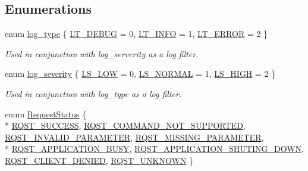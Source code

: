 \subsection*{Enumerations}
\begin{DoxyCompactItemize}
\item 
enum \hyperlink{namespacekisscpp_a18db16d1f4c281bec16e637c56b0cc88}{log\-\_\-type} \{ \hyperlink{namespacekisscpp_a18db16d1f4c281bec16e637c56b0cc88a5534dcd03ff720ecbe64b0c91ea3b228}{L\-T\-\_\-\-D\-E\-B\-U\-G} = 0, 
\hyperlink{namespacekisscpp_a18db16d1f4c281bec16e637c56b0cc88ad1c780d761d1eec16905dd8e306764aa}{L\-T\-\_\-\-I\-N\-F\-O} = 1, 
\hyperlink{namespacekisscpp_a18db16d1f4c281bec16e637c56b0cc88ad444adf89c01661a3f2cacd8baea3d90}{L\-T\-\_\-\-E\-R\-R\-O\-R} = 2
 \}
\begin{DoxyCompactList}\small\item\em Used in conjunction with log\-\_\-serverity as a log filter. \end{DoxyCompactList}\item 
enum \hyperlink{namespacekisscpp_a2479a56cdedf21357ca5c68adc699d00}{log\-\_\-severity} \{ \hyperlink{namespacekisscpp_a2479a56cdedf21357ca5c68adc699d00af0d1f4c43feb2c79cbd2c44cba171b9f}{L\-S\-\_\-\-L\-O\-W} = 0, 
\hyperlink{namespacekisscpp_a2479a56cdedf21357ca5c68adc699d00aac284c5fe534f527e04da9327a0e484e}{L\-S\-\_\-\-N\-O\-R\-M\-A\-L} = 1, 
\hyperlink{namespacekisscpp_a2479a56cdedf21357ca5c68adc699d00a98a2f9d2011b440e4a890b9c0dbb7bc2}{L\-S\-\_\-\-H\-I\-G\-H} = 2
 \}
\begin{DoxyCompactList}\small\item\em Used in conjunction with log\-\_\-type as a log filter. \end{DoxyCompactList}\item 
enum \hyperlink{namespacekisscpp_af5792fb0f68695c1a1e7a4c720d9262e}{Request\-Status} \{ \\*
\hyperlink{namespacekisscpp_af5792fb0f68695c1a1e7a4c720d9262ea48f403b25d056ead863e1bb74664b388}{R\-Q\-S\-T\-\_\-\-S\-U\-C\-C\-E\-S\-S}, 
\hyperlink{namespacekisscpp_af5792fb0f68695c1a1e7a4c720d9262ead080a858803c520f16f1d575431e19ec}{R\-Q\-S\-T\-\_\-\-C\-O\-M\-M\-A\-N\-D\-\_\-\-N\-O\-T\-\_\-\-S\-U\-P\-P\-O\-R\-T\-E\-D}, 
\hyperlink{namespacekisscpp_af5792fb0f68695c1a1e7a4c720d9262ea94213a4c1e365e07fad5537b158ccd8c}{R\-Q\-S\-T\-\_\-\-I\-N\-V\-A\-L\-I\-D\-\_\-\-P\-A\-R\-A\-M\-E\-T\-E\-R}, 
\hyperlink{namespacekisscpp_af5792fb0f68695c1a1e7a4c720d9262ea3ad7cafe8fc0329ea5edde0ebf5c807e}{R\-Q\-S\-T\-\_\-\-M\-I\-S\-S\-I\-N\-G\-\_\-\-P\-A\-R\-A\-M\-E\-T\-E\-R}, 
\\*
\hyperlink{namespacekisscpp_af5792fb0f68695c1a1e7a4c720d9262eaa411a8dcb60e0303c992c74dd4df4f43}{R\-Q\-S\-T\-\_\-\-A\-P\-P\-L\-I\-C\-A\-T\-I\-O\-N\-\_\-\-B\-U\-S\-Y}, 
\hyperlink{namespacekisscpp_af5792fb0f68695c1a1e7a4c720d9262ea1e1bd5f607c7cc861e2f7173253115b4}{R\-Q\-S\-T\-\_\-\-A\-P\-P\-L\-I\-C\-A\-T\-I\-O\-N\-\_\-\-S\-H\-U\-T\-I\-N\-G\-\_\-\-D\-O\-W\-N}, 
\hyperlink{namespacekisscpp_af5792fb0f68695c1a1e7a4c720d9262eab5769a29096e43de01864a3322d45a03}{R\-Q\-S\-T\-\_\-\-C\-L\-I\-E\-N\-T\-\_\-\-D\-E\-N\-I\-E\-D}, 
\hyperlink{namespacekisscpp_af5792fb0f68695c1a1e7a4c720d9262ea8b54c6e47b50ce90a375d79b957f5ddb}{R\-Q\-S\-T\-\_\-\-U\-N\-K\-N\-O\-W\-N}
 \}
\end{DoxyCompactItemize}
